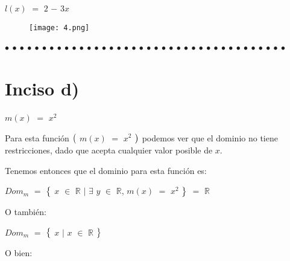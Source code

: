 \documentclass[12pt]{article}
\newenvironment{MyColorPar}[1]{%
    \leavevmode\color{#1}\ignorespaces%
}{%
}%
\begin{document}
\begin{MyColorPar}{Lochinvar} \bfseries{
{}}  
\end{MyColorPar} \vspace{0.5cm}

  $l(x)$ $=$ $2$ $-$ $3x$ \vspace{0.5cm}

\begin{figure}[H] \centering

    \texttt{[image: 4.png]} 

\end{figure}
 
 \begin{MyColorPar}{Saffron} \bfseries{
 $\bullet$ $\bullet$ $\bullet$ $\bullet$ $\bullet$ $\bullet$ $\bullet$ $\bullet$ $\bullet$ $\bullet$ $\bullet$ $\bullet$ $\bullet$ $\bullet$ $\bullet$ $\bullet$ $\bullet$ $\bullet$ $\bullet$ $\bullet$ $\bullet$ $\bullet$ $\bullet$ $\bullet$ $\bullet$ $\bullet$ $\bullet$ $\bullet$ $\bullet$ $\bullet$ $\bullet$ $\bullet$ $\bullet$ $\bullet$ $\bullet$ $\bullet$ $\bullet$ $\bullet$  }
\end{MyColorPar} \vspace{0.5cm}

\section*{{\textcolor{verde_manzana}{\textsf{\bfseries{Inciso d)}}}}}

\begin{MyColorPar}{verde_manzana} 
   $m(x)$ $=$ $x^{2}$ 
    \end{MyColorPar} \vspace{0.5cm}

\begin{MyColorPar}{verde_manzana} \bfseries{
{} 
Para esta función $\big{(}$  $m(x)$ $=$ $x^{2}$  $\big{)}$ podemos ver que el dominio no tiene restricciones, dado que acepta cualquier valor posible de $x$. \vspace{0.5cm}

Tenemos entonces que el dominio para esta función es: \vspace{0.5cm}

\hspace{2cm} $Dom_{m}$ $=$ $\big{\{}$ $x$ $\in$ $\mathbb{R}$ $\mid$ $\exists$ $y$ $\in$ $\mathbb{R}$, $m(x)$ $=$ $x^{2}$  $\big{\}}$ $=$ $\mathbb{R}$  \vspace{0.5cm}

O también: 

\hspace{2cm} $Dom_{m}$ $=$ $\big{\{}$ $x$ $\mid$  $x$ $\in$ $\mathbb{R}$  $\big{\}}$ \vspace{0.5cm}

O bien: 

\hspace{3cm}  \vspace{0.5cm}
}
\end{MyColorPar}
\end{document}
